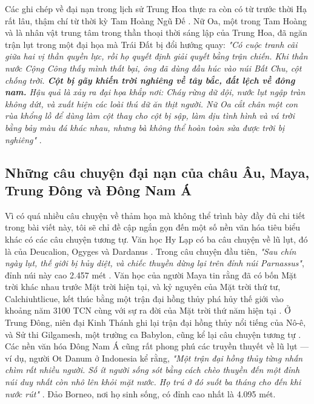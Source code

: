 \documentclass[10pt,twocolumn,letterpaper]{article}
\begin{document}
Các ghi chép về đại nạn trong lịch sử Trung Hoa thực ra còn có từ trước thời Hạ rất lâu, thậm chí từ thời kỳ Tam Hoàng Ngũ Đế \cite{7}. Nữ Oa, một trong Tam Hoàng và là nhân vật trung tâm trong thần thoại thời sáng lập của Trung Hoa, đã ngăn trận lụt trong một đại họa mà Trái Đất bị đổi hướng quay: \textit{"Có cuộc tranh cãi giữa hai vị thần quyền lực, rồi họ quyết định giải quyết bằng trận chiến. Khi thần nước Cộng Công thấy mình thất bại, ông đã dùng đầu húc vào núi Bất Chu, cột chống trời. \textbf{Cột bị gãy khiến trời nghiêng về tây bắc, đất lệch về đông nam.} Hậu quả là xảy ra đại họa khắp nơi: Cháy rừng dữ dội, nước lụt ngập tràn không dứt, và xuất hiện các loài thú dữ ăn thịt người. Nữ Oa cắt chân một con rùa khổng lồ để dùng làm cột thay cho cột bị sập, làm dịu tình hình và vá trời bằng bảy màu đá khác nhau, nhưng bà không thể hoàn toàn sửa được trời bị nghiêng"} \cite{8}.

\subsection{Những câu chuyện đại nạn của châu Âu, Maya, Trung Đông và Đông Nam Á}

Vì có quá nhiều câu chuyện về thảm họa mà không thể trình bày đầy đủ chi tiết trong bài viết này, tôi sẽ chỉ đề cập ngắn gọn đến một số nền văn hóa tiêu biểu khác có các câu chuyện tương tự. Văn học Hy Lạp có ba câu chuyện về lũ lụt, đó là của Deucalion, Ogyges và Dardanus \cite{9,10}. Trong câu chuyện đầu tiên, \textit{"Sau chín ngày lụt, thế giới bị hủy diệt, và chiếc thuyền dừng lại trên đỉnh núi Parnassus"}, đỉnh núi này cao 2.457 mét \cite{11}. Văn học của người Maya tin rằng đã có bốn Mặt trời khác nhau trước Mặt trời hiện tại, và kỷ nguyên của Mặt trời thứ tư, Calchiuhtlicue, kết thúc bằng một trận đại hồng thủy phá hủy thế giới vào khoảng năm 3100 TCN cùng với sự ra đời của Mặt trời thứ năm hiện tại \cite{12}. Ở Trung Đông, niên đại Kinh Thánh ghi lại trận đại hồng thủy nổi tiếng của Nô-ê, và Sử thi Gilgamesh, một trường ca Babylon, cũng kể lại câu chuyện tương tự \cite{13}. Các nền văn hóa Đông Nam Á cũng rất phong phú các truyền thuyết về lũ lụt — ví dụ, người Ot Danum ở Indonesia kể rằng, \textit{"Một trận đại hồng thủy từng nhấn chìm rất nhiều người. Số ít người sống sót bằng cách chèo thuyền đến một đỉnh núi duy nhất còn nhô lên khỏi mặt nước. Họ trú ở đó suốt ba tháng cho đến khi nước rút"} \cite{3}. Đảo Borneo, nơi họ sinh sống, có đỉnh cao nhất là 4.095 mét.
\end{document}
